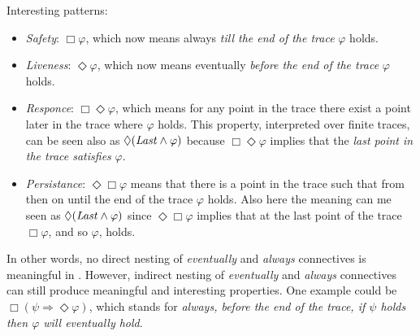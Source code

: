 \begin{example}\label{ltlf-formula-examples}
Interesting \LTLf patterns:
\begin{itemize}
	\item \emph{Safety}: $\Box \varphi$, which now means always \emph{till the end of the trace} $\varphi$ holds.
	\item \emph{Liveness}: $\Diamond \varphi$, which now means eventually \emph{before the end of the trace} $\varphi$ holds.
	\item \emph{Responce}: $\Box \Diamond \varphi$, which means for any point in the trace there exist a point later in the trace where $\varphi$ holds.
This property, interpreted over finite traces, can be seen also as $\Diamond (\mathit{Last}\land\varphi)$ because $\Box \Diamond \varphi$ implies that the \emph{last point in the trace satisfies} $\varphi$.
	\item \emph{Persistance}: $\Diamond \Box \varphi$ means that there is a point in the trace such that from then on until the end of the trace $\varphi$ holds. Also here the meaning can me seen as $\Diamond (\mathit{Last}\land\varphi)$ since $\Diamond \Box \varphi$ implies that at the last point of the trace $ \Box \varphi$, and so $\varphi$, holds.
\end{itemize}
\end{example}
In other words, no direct nesting of \textit{eventually} and \textit{always} connectives is meaningful in \LTLf. However, indirect nesting of \textit{eventually} and \textit{always} connectives can still produce meaningful and interesting properties. One example could be $\Box(\psi \Rightarrow \Diamond\varphi)$, which stands for \emph{always, before the end of the trace, if $\psi$ holds then $\varphi$ will eventually hold}.
